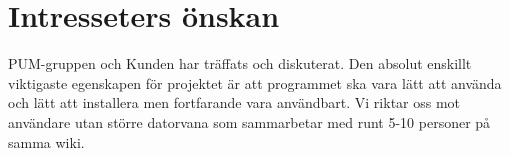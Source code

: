 \section{Intresseters önskan}
PUM-gruppen och Kunden har träffats och diskuterat. Den absolut enskillt viktigaste egenskapen för projektet är att programmet ska vara lätt att använda och lätt att installera men fortfarande vara användbart.  Vi riktar oss mot användare utan större datorvana som sammarbetar med runt 5-10 personer på samma wiki. 
